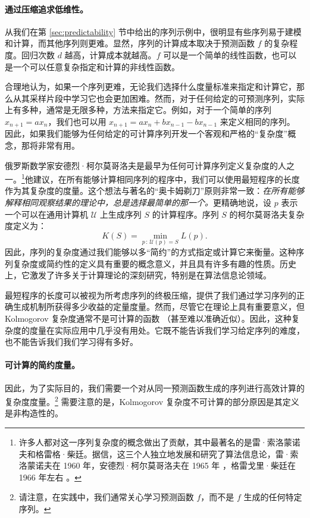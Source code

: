 \documentclass[../../book-main.tex]{subfiles}
\begin{document}
\paragraph{通过压缩追求低维性。}
从我们在第 \ref{sec:predictability} 节中给出的序列示例中，很明显有些序列易于建模和计算，而其他序列则更难。显然，序列的计算成本取决于预测函数 $f$ 的复杂程度。回归次数 $d$ 越高，计算成本就越高。$f$ 可以是一个简单的线性函数，也可以是一个可以任意复杂指定和计算的非线性函数。

合理地认为，如果一个序列更难，无论我们选择什么度量标准来指定和计算它，那么从其采样片段中学习它也会更加困难。然而，对于任何给定的可预测序列，实际上有多种，通常是无限多种，方法来指定它。例如，对于一个简单的序列 $x_{n+1} = a x_{n}$，我们也可以用 $x_{n+1} = a x_n + b x_{n-1} - b x_{n-1}$ 来定义相同的序列。
因此，如果我们能够为任何给定的可计算序列开发一个客观和严格的“复杂度”概念，那将非常有用。

俄罗斯数学家安德烈·柯尔莫哥洛夫是最早为任何可计算序列定义复杂度的人之一。\footnote{许多人都对这一序列复杂度的概念做出了贡献，其中最著名的是雷·索洛蒙诺夫和格雷格·柴廷。据信，这三个人独立地发展和研究了算法信息论，雷·索洛蒙诺夫在 1960 年，安德烈·柯尔莫哥洛夫在 1965 年 \cite{Kolmogorov1998OnTO}，格雷戈里·柴廷在 1966 年左右 \cite{Chaitin-1966}。}他建议，在所有能够计算相同序列的程序中，我们可以使用最短程序的长度作为其复杂度的度量。这个想法与著名的“奥卡姆剃刀”原则非常一致：{\em 在所有能够解释相同观察结果的理论中，总是选择最简单的那一个。}更精确地说，设 $p$ 表示一个可以在通用计算机 $\mathcal{U}$ 上生成序列 $S$ 的计算程序。序列 $S$ 的柯尔莫哥洛夫复杂度定义为：
\begin{equation}
    K(S) = \min_{p\,:\, \mathcal{U}(p) = S} L(p). 
\end{equation}
因此，序列的复杂度通过我们能够以多“简约”的方式指定或计算它来衡量。这种序列复杂度或简约性的定义具有重要的概念意义，并且具有许多有趣的性质。历史上，它激发了许多关于计算理论的深刻研究，特别是在算法信息论领域。

最短程序的长度可以被视为所考虑序列的终极压缩，提供了我们通过学习序列的正确生成机制所获得多少收益的定量度量。然而，尽管它在理论上具有重要意义，但 Kolmogorov 复杂度通常不是可计算的函数 \cite{Cover-Thomas}（甚至难以准确近似）。因此，这种复杂度的度量在实际应用中几乎没有用处。它既不能告诉我们学习给定序列的难度，也不能告诉我们我们学习得有多好。


\paragraph{可计算的简约度量。}
因此，为了实际目的，我们需要一个对从同一预测函数生成的序列进行高效计算的复杂度度量。\footnote{请注意，在实践中，我们通常关心学习预测函数 $f$，而不是 $f$ 生成的任何特定序列。} 需要注意的是，Kolmogorov 复杂度不可计算的部分原因是其定义是非构造性的。
\end{document}
